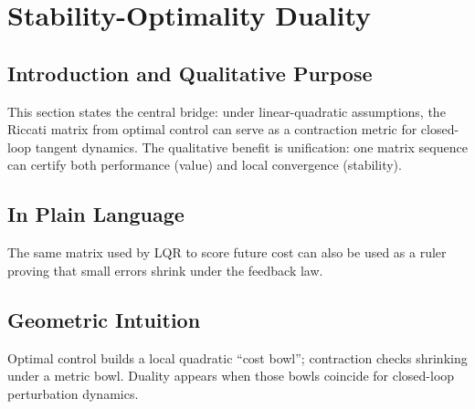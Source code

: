 \documentclass[11pt,letterpaper]{article}
\begin{document}
\section{Stability-Optimality Duality}

\subsection{Introduction and Qualitative Purpose}
This section states the central bridge: under linear-quadratic assumptions, the Riccati matrix from optimal control can serve as a contraction metric for closed-loop tangent dynamics. The qualitative benefit is unification: one matrix sequence can certify both performance (value) and local convergence (stability).

\subsection{In Plain Language}
The same matrix used by LQR to score future cost can also be used as a ruler proving that small errors shrink under the feedback law.

\subsection{Geometric Intuition}
Optimal control builds a local quadratic ``cost bowl''; contraction checks shrinking under a metric bowl. Duality appears when those bowls coincide for closed-loop perturbation dynamics.
\end{document}
